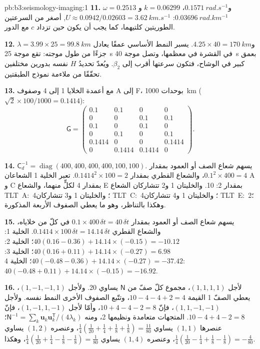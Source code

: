 \begin{solution}{pb:b3:seismology-imaging:1}
\textbf{11.} $\omega = 0.2513$ و$\qty{0.1571}{rad.s^{-1}}$، $k = 0.06299$
و$\qty{0.03696}{rad.km^{-1}}$: $U \approx 0.0942/0.02603 = \qty{3.62}{km.s^{-1}}$,
أصغر من السرعتين الطوريتين كلتيهما، كما يجب أن يكون حين تزداد $c$ مع
الدور.

\textbf{12.} $\lambda = 3.99\times25 = \qty{99.8}{km}$ و$4.25\times40 =
\qty{170}{km}$. يسبر النمط الأساسي عمقًا يعادل جزءًا
من طول موجته: تقع موجة \qty{25}{s} في القشرة في معظمها، وتصل موجة \qty{40}{s}
بعمق كبير في الوشاح، فتكون سرعتها أقرب إلى $\beta_2$. ويُعدّ تحديدُ
$H$ نفسه بدورين مختلفين تحقّقًا من ملاءمة نموذج الطبقتين.

\textbf{13.} مع أعمدة الخلايا 1 إلى 4 وصفوف A إلى F، بوحدات
\qty{1000}{km} ($\sqrt2\times100/1000 = 0.1414$):
\[
  \mathsf G = \begin{pmatrix}
  0.1 & 0.1 & 0 & 0 \\ 0 & 0 & 0.1 & 0.1 \\ 0.1 & 0 & 0.1 & 0 \\
  0 & 0.1 & 0 & 0.1 \\ 0.1414 & 0 & 0 & 0.1414 \\ 0 & 0.1414 & 0.1414 & 0
  \end{pmatrix}.
\]

\textbf{14.} $\mathsf C_d^{-1} = \operatorname{diag}(400, 400, 400, 400, 100,
100)$. يسهم شعاع الصف أو العمود بمقدار $0.1^2\times400 = 4$، والشعاع القطري
بمقدار $0.1414^2\times100 = 2$. تعبر الخلية 1 الشعاعان A و C بمقدار 4 لكلٍّ منهما، والشعاع E بمقدار 2: 10. والخليتان
1 و2 تتشاركان الشعاع \mbox{\textdir TLT A: 4}؛ والخليتان 1 و3 تتشاركان \mbox{\textdir TLT C: 4}؛ والخليتان 1 و4 تتشاركان \mbox{\textdir TLT E: 2}؛
وهكذا بالتناظر، وهو ما يعطي الصفوف الأربعة المذكورة.

\textbf{15.} يسهم شعاع الصف أو العمود بمقدار $0.1\times400\,\delta t = 40\,
\delta t$ في كلّ من خلاياه، والشعاع القطري $0.1414\times100\,\delta t =
14.14\,\delta t$. الخلية 1: $40(0.16 - 0.36) + 14.14\times(-0.15) = -10.12$؛ الخلية
2: $40(0.16 + 0.11) + 14.14\times(-0.27) = 6.98$؛ الخلية 3: $40(-0.48 - 0.36) +
14.14\times(-0.27) = -37.42$؛ الخلية 4: $40(-0.48 + 0.11) + 14.14\times(-0.15) =
-16.92$.

\textbf{16.} لأجل $(1,1,1,1)$، مجموع كلّ صفّ من $\mathsf N$ يساوي 20. ولأجل
$(1,-1,-1,1)$، يعطي الصفّ 1 القيمة $10 - 4 - 4 + 2 = 4$، وتتّبع الصفوف الأخرى
النمط نفسه. ولأجل $(1,1,-1,-1)$، فإنّ $10 + 4 - 4 - 2 = 8$، وأمّا لأجل $(1,-1,1,-1)$،
فإنّ $10 - 4 + 4 - 2 = 8$. المتجهات متعامدة ونظيمها 2، ومنه
$\mathsf N^{-1} = \sum_k \mathbf u_k\mathbf u_k^{\mathsf T}/(4\lambda_k)$؛
عنصرها $(1,1)$ يساوي $\tfrac14(\tfrac1{20} + \tfrac14 + \tfrac18 + \tfrac18) =
\tfrac{11}{80}$، وعنصره $(1,2)$ يساوي $\tfrac14(\tfrac1{20} - \tfrac14 + \tfrac18
- \tfrac18) = -\tfrac4{80}$، وعنصره $(1,4)$ يساوي $\tfrac14(\tfrac1{20} +
\tfrac14 - \tfrac18 - \tfrac18) = \tfrac1{80}$، وهكذا.


\end{solution}
